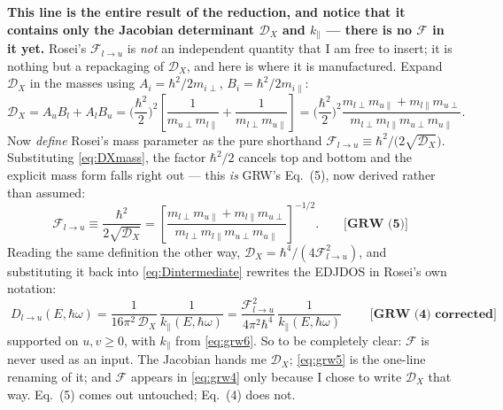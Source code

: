 \documentclass[11pt,a4paper]{article}
\numberwithin{equation}{section}
\newcommand{\hw}{\hbar\omega}
\newcommand{\cD}{\mathcal{D}}
\newcommand{\cF}{\mathcal{F}}
\newcommand{\kpar}{k_{\parallel}}
\newcommand{\grweq}[1]{\textbf{[GRW~(#1)]}}
\newcommand{\grwfix}[1]{\textbf{[GRW~(#1) corrected]}}
\begin{document}
\noindent
\textbf{This line is the entire result of the reduction, and notice
that it contains only the Jacobian determinant $\cD_X$ and $\kpar$
--- there is no $\cF$ in it yet.} Rosei's $\cF_{l\to u}$ is \emph{not}
an independent quantity that I am free to insert; it is nothing but a
repackaging of $\cD_X$, and here is where it is manufactured. Expand
$\cD_X$ in the masses using $A_i=\hbar^2/2m_{i\perp}$,
$B_i=\hbar^2/2m_{i\parallel}$:
\begin{equation}
\cD_X=A_uB_l+A_lB_u
=\Big(\frac{\hbar^2}{2}\Big)^{\!2}
 \left[\frac{1}{m_{u\perp}m_{l\parallel}}
      +\frac{1}{m_{l\perp}m_{u\parallel}}\right]
=\Big(\frac{\hbar^2}{2}\Big)^{\!2}
 \frac{m_{l\perp}m_{u\parallel}+m_{l\parallel}m_{u\perp}}
      {m_{l\perp}m_{l\parallel}m_{u\perp}m_{u\parallel}} .
\label{eq:DXmass}
\end{equation}
Now \emph{define} Rosei's mass parameter as the pure shorthand
$\cF_{l\to u}\equiv\hbar^2/\bigl(2\sqrt{\cD_X}\bigr)$. Substituting
\eqref{eq:DXmass}, the factor $\hbar^2/2$ cancels top and bottom and
the explicit mass form falls right out --- this \emph{is} GRW's
Eq.~(5), now derived rather than assumed:
\begin{equation}
\cF_{l\to u}\equiv\frac{\hbar^2}{2\sqrt{\cD_{X}}}
=\left[\frac{m_{l\perp}m_{u\parallel}+m_{l\parallel}m_{u\perp}}
{m_{l\perp}m_{l\parallel}m_{u\perp}m_{u\parallel}}\right]^{-1/2}.
\qquad\grweq{5}
\label{eq:grw5}
\end{equation}
Reading the same definition the other way, $\cD_X=\hbar^4/(4\cF_{l\to
u}^2)$, and substituting it back into \eqref{eq:Dintermediate}
rewrites the EDJDOS in Rosei's own notation:
\begin{equation}
\boxed{\;
D_{l\to u}(E,\hw)
=\frac{1}{16\pi^2\,\cD_{X}}\,\frac{1}{\kpar(E,\hw)}
=\frac{\cF^2_{l\to u}}{4\pi^2\hbar^4}\,\frac{1}{\kpar(E,\hw)}
\;}\qquad\grwfix{4}
\label{eq:grw4}
\end{equation}
supported on $u,v\ge0$, with $\kpar$ from \eqref{eq:grw6}. So to be
completely clear: $\cF$ is never used as an input. The Jacobian hands
me $\cD_X$; \eqref{eq:grw5} is the one-line renaming of it; and $\cF$
appears in \eqref{eq:grw4} only because I chose to write $\cD_X$ that
way. Eq.~(5) comes out untouched; Eq.~(4) does not.
\end{document}
